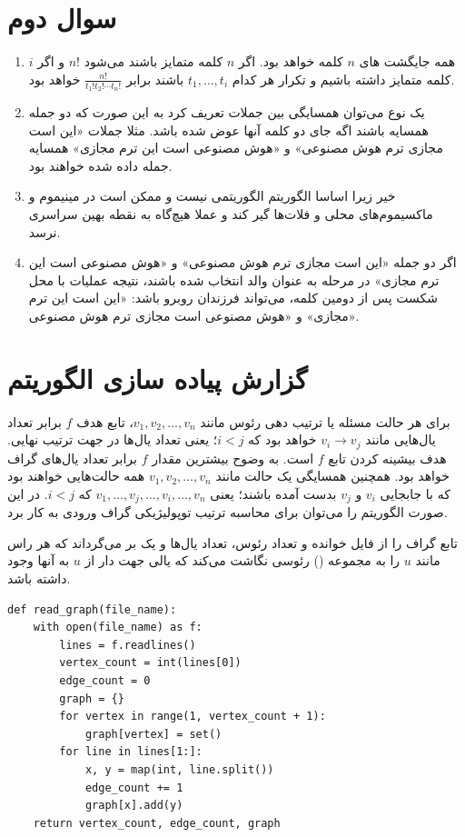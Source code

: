\documentclass{article}
\newcommand{\code}[1]{\lr{\lstinline|#1|}}
\begin{document}
	\section*{
		سوال دوم
	}
	\begin{enumerate}
		\item 
	 	همه جایگشت های $n$ کلمه خواهد بود. اگر $n$ کلمه متمایز باشند می‌شود $n!$ و اگر $i$ کلمه متمایز داشته باشیم و  تکرار هر کدام 
	 	$t_1, \dots , t_i$
	 	باشند برابر
	 	$\frac{n!}{t_1!t_2!\cdots t_n!}$
	 	خواهد بود.
	 	\item 
	 	یک نوع می‌توان همسایگی بین جملات تعریف کرد به این صورت که دو جمله همسایه باشند اگه جای دو کلمه آنها عوض شده باشد. مثلا جملات «این است مجازی ترم هوش مصنوعی» و «هوش مصنوعی است این ترم مجازی» همسایه جمله داده شده خواهند بود.
	 	\item 
	 	خیر زیرا اساسا الگوریتم 
	 	الگوریتمی
	 	نیست و ممکن است در مینیموم و ماکسیموم‌های محلی و فلات‌ها گیر کند و عملا هیچ‌گاه به نقطه بهین سراسری نرسد.
	 	\item 
	 	اگر دو جمله «این است مجازی ترم هوش مصنوعی» و «هوش مصنوعی است این ترم مجازی» در مرحله
	 	به عنوان والد انتخاب شده باشند، نتیجه عملیات 
	 	با محل شکست پس از دومین کلمه، می‌تواند فرزندان روبرو باشد: «این است این ترم مجازی» و «هوش مصنوعی است مجازی ترم هوش مصنوعی».
	 	
	\end{enumerate}
	\section*{
	گزارش پیاده سازی الگوریتم 
}
برای هر حالت مسئله یا ترتیب دهی رئوس مانند $v_1, v_2, \dots, v_n$، تابع هدف $f$ برابر تعداد یال‌هایی مانند $v_i \rightarrow v_j$ خواهد بود که $i < j$؛ یعنی تعداد یال‌ها در جهت ترتیب نهایی. هدف بیشینه کردن تابع $f$ است. به وضوح بیشترین مقدار $f$ برابر تعداد یال‌های گراف خواهد بود. همچنین همسایگی یک حالت مانند $v_1, v_2, \dots, v_n$ همه حالت‌هایی خواهند بود که با جابجایی $v_i$ و $v_j$ بدست آمده باشند؛ یعنی $v_1, \dots, v_j, \dots, v_i, \dots, v_n$ که $i < j$. در این صورت الگوریتم  را می‌توان برای محاسبه ترتیب توپولیژیکی گراف ورودی به کار برد.

تابع 
\code{read\_graph()}
گراف را از فایل خوانده و تعداد رئوس، تعداد یال‌ها و یک 
\code{dict}
بر می‌گرداند که هر راس مانند $u$ را به مجموعه (\code{set}) رئوسی نگاشت می‌کند که یالی جهت دار از $u$ به آنها وجود داشته باشد.

\begin{latin}
\begin{lstlisting}
def read_graph(file_name):
	with open(file_name) as f:
		lines = f.readlines()
		vertex_count = int(lines[0])
		edge_count = 0
		graph = {}
		for vertex in range(1, vertex_count + 1):
			graph[vertex] = set()
		for line in lines[1:]:
			x, y = map(int, line.split())
			edge_count += 1
			graph[x].add(y)
	return vertex_count, edge_count, graph
\end{lstlisting}
\end{latin}
\end{document}
